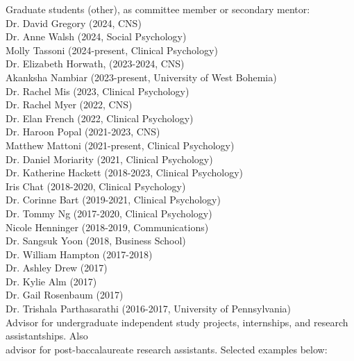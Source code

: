 \documentclass[11pt, letterpaper]{article}
\begin{document}
\begin{tabbing}
Graduate students (other), as committee member or secondary mentor: \\  [.1cm]
\> Dr. David Gregory (2024, CNS) \\
\> Dr. Anne Walsh (2024, Social Psychology) \\
\> Molly Tassoni (2024-present, Clinical Psychology) \\
\> Dr. Elizabeth Horwath, (2023-2024, CNS) \\
\> Akanksha Nambiar (2023-present, University of West Bohemia) \\
\> Dr. Rachel Mis (2023, Clinical Psychology) \\
\> Dr. Rachel Myer (2022, CNS) \\
\> Dr. Elan French (2022, Clinical Psychology) \\
\> Dr. Haroon Popal (2021-2023, CNS) \\
\> Matthew Mattoni (2021-present, Clinical Psychology) \\
\> Dr. Daniel Moriarity (2021, Clinical Psychology) \\
\> Dr. Katherine Hackett (2018-2023, Clinical Psychology) \\
\> Iris Chat (2018-2020, Clinical Psychology) \\
\> Dr. Corinne Bart (2019-2021, Clinical Psychology) \\
\> Dr. Tommy Ng (2017-2020, Clinical Psychology) \\
\> Nicole Henninger (2018-2019, Communications) \\
\> Dr. Sangsuk Yoon (2018, Business School) \\
\> Dr. William Hampton (2017-2018) \\
\> Dr. Ashley Drew (2017) \\
\> Dr. Kylie Alm (2017) \\
\> Dr. Gail Rosenbaum (2017) \\
\> Dr. Trishala Parthasarathi (2016-2017, University of Pennsylvania) \\ [.2cm]

Advisor for undergraduate independent study projects, internships, and research assistantships. Also \\
\> advisor for post-baccalaureate research assistants. Selected examples below: \\  [.1cm]


\end{tabbing}
\end{document}
